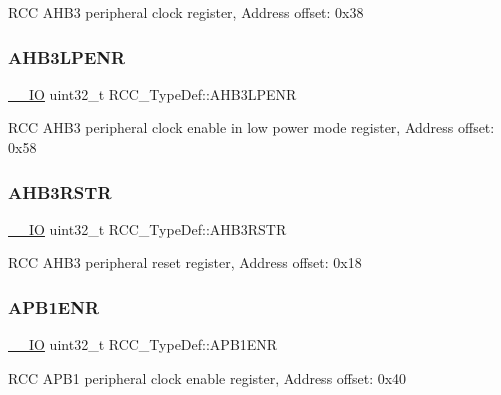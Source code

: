 R\+CC A\+H\+B3 peripheral clock register, Address offset\+: 0x38 \mbox{\label{struct_r_c_c___type_def_a95edda857c3725bfb410d3a4707edfd8}} 
\subsubsection{\texorpdfstring{AHB3LPENR}{AHB3LPENR}}
{\footnotesize\ttfamily \mbox{\hyperlink{core__sc300_8h_aec43007d9998a0a0e01faede4133d6be}{\+\_\+\+\_\+\+IO}} uint32\+\_\+t R\+C\+C\+\_\+\+Type\+Def\+::\+A\+H\+B3\+L\+P\+E\+NR}

R\+CC A\+H\+B3 peripheral clock enable in low power mode register, Address offset\+: 0x58 \mbox{\label{struct_r_c_c___type_def_a39a90d838fbd0b8515f03e4a1be6374f}} 
\subsubsection{\texorpdfstring{AHB3RSTR}{AHB3RSTR}}
{\footnotesize\ttfamily \mbox{\hyperlink{core__sc300_8h_aec43007d9998a0a0e01faede4133d6be}{\+\_\+\+\_\+\+IO}} uint32\+\_\+t R\+C\+C\+\_\+\+Type\+Def\+::\+A\+H\+B3\+R\+S\+TR}

R\+CC A\+H\+B3 peripheral reset register, Address offset\+: 0x18 \mbox{\label{struct_r_c_c___type_def_aec7622ba90341c9faf843d9ee54a759f}} 
\subsubsection{\texorpdfstring{APB1ENR}{APB1ENR}}
{\footnotesize\ttfamily \mbox{\hyperlink{core__sc300_8h_aec43007d9998a0a0e01faede4133d6be}{\+\_\+\+\_\+\+IO}} uint32\+\_\+t R\+C\+C\+\_\+\+Type\+Def\+::\+A\+P\+B1\+E\+NR}

R\+CC A\+P\+B1 peripheral clock enable register, Address offset\+: 0x40 \mbox{\label{struct_r_c_c___type_def_a5c8e710c40b642dcbf296201a7ecb2da}} 
